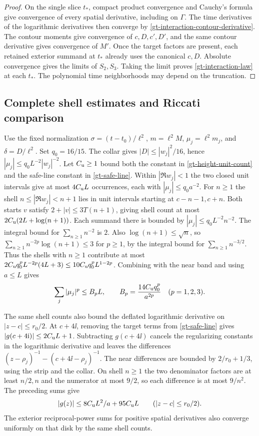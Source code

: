 \begin{proof}
On the single slice \(t_*\), compact product convergence and
Cauchy's formula give convergence of every spatial derivative,
including on \(\Gamma\). The time derivatives of the logarithmic
derivatives then converge by
\eqref{gt-interaction-contour-derivative}. The contour moments give
convergence of \(c,D,c',D'\), and the same contour derivative gives
convergence of \(M'\). Once the target factors are present, each
retained exterior summand at \(t_*\) already uses the canonical
\(c,D\). Absolute convergence gives the limits of \(S_2,S_3\).
Taking the limit proves \eqref{gt-interaction-law} at each \(t_*\).
The polynomial time neighborhoods may depend on the truncation.
\end{proof}

\subsection{Complete shell estimates and Riccati comparison}

Use the fixed normalization
\(\sigma=(t-t_0)/\ell^2\), \(m=\ell^2 M\),
\(\mu_j=\ell^2m_j\), and \(\delta=D/\ell^2\).
Set \(q_0=16/15\). The collar gives
\(|D|\le |w_j|^2/16\), hence
\(|\mu_j|\le q_0 L^{-2}|w_j|^{-2}\). Let \(C_{\rm u}\ge1\)
bound both the constant in \eqref{gt-height-unit-count} and
the safe-line constant in \eqref{gt-safe-line}.
Within \(|\Re w_j|<1\) the two closed unit intervals give at most
\(4C_{\rm u}L\) occurrences, each with
\(|\mu_j|\le q_0a^{-2}\). For \(n\ge1\) the shell
\(n\le|\Re w_j|<n+1\) lies in unit intervals starting at
\(c-n-1,c+n\). Both starts \(v\) satisfy
\(2+|v|\le 3T(n+1)\), giving shell count at most
\(2C_{\rm u}(2L+\log(n+1))\). Each summand there is bounded by
\(|\mu_j|\le q_0 L^{-2}n^{-2}\). The integral bound for
\(\sum_{n\ge1}n^{-2}\) is \(2\). Also \(\log(n+1)\le\sqrt n\),
so \(\sum_{n\ge1}n^{-2p}\log(n+1)\le3\) for \(p\ge1\), by the
integral bound for \(\sum_{n\ge1}n^{-3/2}\). Thus the shells with
\(n\ge1\) contribute at most
\(2C_{\rm u}q_0^p L^{-2p}(4L+3)\le10C_{\rm u}q_0^p L^{1-2p}\).
Combining with the near band and using \(a\le L\) gives
\begin{equation}
 \sum_j|\mu_j|^p\le B_pL,\qquad
 B_p=\frac{14C_{\rm u}q_0^p}{a^{2p}}\quad(p=1,2,3).
 \label{gt-interaction-shell}
\end{equation}

The same shell counts also bound the deflated logarithmic derivative
on \(|z-c|\le r_0/2\). At \(c+4\ii\), removing the target terms
from \eqref{gt-safe-line} gives \(|g(c+4\mathrm i)|\le2C_{\rm u}L+1\).
Subtracting \(g(c+4\ii)\) cancels the regularizing constants in the
logarithmic derivative and leaves the differences
\((z-\rho_j)^{-1}-(c+4\ii-\rho_j)^{-1}\).
The near differences are bounded by \(2/r_0+1/3\), using the
strip and the collar. On shell \(n\ge1\) the two denominator
factors are at least \(n/2,n\) and the numerator at most \(9/2\),
so each difference is at most \(9/n^2\). The preceding sums give
\[
 |g(z)|\le 8C_{\rm u}L^2/a+95C_{\rm u}L
 \qquad (|z-c|\le r_0/2).
\]
The exterior reciprocal-power sums for positive spatial derivatives
also converge uniformly on that disk by the same shell counts.

